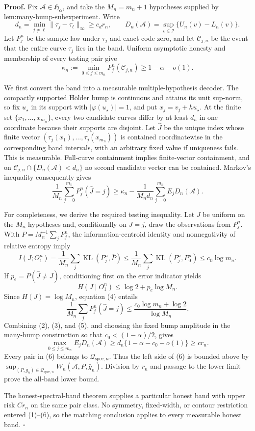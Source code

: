 \textbf{Proof.}
Fix \(\mathcal A\in\mathfrak H_\alpha\), and take the \(M_n=m_n+1\) hypotheses supplied by \(\text{lem:many-bump-subexperiment}\).  Write
\[
 d_n=\min_{j\ne\ell}\|\tau_j-\tau_\ell\|_\infty\ge c_dr_n,
 \qquad
 D_n(\mathcal A)=\sup_{v\in\mathcal I}\{U_n(v)-L_n(v)\}. \tag{1}
\]
Let \(P_j^n\) be the sample law under \(\tau_j\) and exact code zero, and let \(\mathcal C_{j,n}\) be the event that the entire curve \(\tau_j\) lies in the band.  Uniform asymptotic honesty and membership of every testing pair give
\[
 \kappa_n:=\min_{0\le j\le m_n}P_j^n(\mathcal C_{j,n})
 \ge1-\alpha-o(1). \tag{2}
\]

We first convert the band into a measurable multiple-hypothesis decoder.  The compactly supported H\"older bump is continuous and attains its unit sup-norm, so fix \(u_\star\) in its support with \(|\varphi(u_\star)|=1\), and put \(x_j=v_j+hu_\star\).  At the finite set \(\{x_1,\ldots,x_{m_n}\}\), every two candidate curves differ by at least \(d_n\) in one coordinate because their supports are disjoint.  Let \(\widehat J\) be the unique index whose finite vector \((\tau_j(x_1),\ldots,\tau_j(x_{m_n}))\) is contained coordinatewise in the corresponding band intervals, with an arbitrary fixed value if uniqueness fails.  This is measurable.  Full-curve containment implies finite-vector containment, and on \(\mathcal C_{j,n}\cap\{D_n(\mathcal A)<d_n\}\) no second candidate vector can be contained.  Markov's inequality consequently gives
\[
 \frac1{M_n}\sum_{j=0}^{m_n}P_j^n(\widehat J=j)
 \ge \kappa_n-
 \frac1{M_nd_n}\sum_{j=0}^{m_n}E_jD_n(\mathcal A). \tag{3}
\]

For completeness, we derive the required testing inequality.  Let \(J\) be uniform on the \(M_n\) hypotheses and, conditionally on \(J=j\), draw the observations from \(P_j^n\).  With \(\overline P=M_n^{-1}\sum_jP_j^n\), the information-centroid identity and nonnegativity of relative entropy imply
\[
 I(J;O_1^n)
 =\frac1{M_n}\sum_j\operatorname{KL}(P_j^n,\overline P)
 \le\frac1{M_n}\sum_j\operatorname{KL}(P_j^n,P_0^n)
 \le c_0\log m_n. \tag{4}
\]
If \(p_e=P(\widehat J\ne J)\), conditioning first on the error indicator yields
\[
 H(J\mid O_1^n)\le\log2+p_e\log M_n.
\]
Since \(H(J)=\log M_n\), equation (4) entails
\[
 \frac1{M_n}\sum_jP_j^n(\widehat J=j)
 \le\frac{c_0\log m_n+\log2}{\log M_n}. \tag{5}
\]
Combining (2), (3), and (5), and choosing the fixed bump amplitude in the many-bump construction so that \(c_0<(1-\alpha)/2\), gives
\[
 \max_{0\le j\le m_n}E_jD_n(\mathcal A)
 \ge d_n\{1-\alpha-c_0-o(1)\}
 \ge cr_n. \tag{6}
\]
Every pair in (6) belongs to \(\mathcal Q_{\mathrm{spec},n}\).  Thus the left side of (6) is bounded above by
\(\sup_{(P,\bar g_n)\in\mathcal Q_{\mathrm{spec},n}}W_n(\mathcal A,P,\bar g_n)\).  Division by \(r_n\) and passage to the lower limit prove the all-band lower bound.

The honest-spectral-band theorem supplies a particular honest band with upper risk \(Cr_n\) on the same pair class.  No symmetry, fixed-width, or contour restriction entered (1)--(6), so the matching conclusion applies to every measurable honest band. \(\square\)
